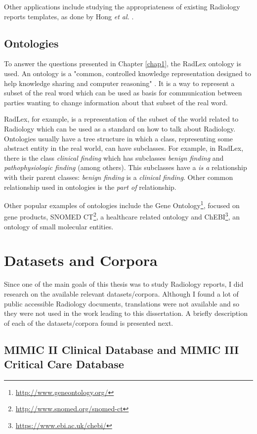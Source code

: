 Other applications include studying the appropriateness of existing Radiology reports templates, as done by Hong \textit{et al.} \citep{Hong2013}.

\subsection{Ontologies}

To answer the questions presented in Chapter \ref{chap1}, the RadLex ontology is used. An ontology is a "common, controlled knowledge representation designed to help knowledge sharing and computer reasoning" \citep{Robinson2011}. It is a way to represent a subset of the real word  which can be used as basis for communication between parties wanting to change information about that subset of the real word.

RadLex, for example, is a representation of the subset of the world related to Radiology which can be used as a standard on how to talk about Radiology. Ontologies usually have a tree structure in which a class, representing some abstract entity in the real world, can have subclasses. For example, in RadLex, there is the class \textit{clinical finding} which has subclasses \textit{benign finding} and \textit{pathophysiologic finding} (among others). This subclasses have a \textit{is a} relationship with their parent classes: \textit{benign finding} is a \textit{clinical finding}. Other common relationship used in ontologies is the \textit{part of} relationship.

Other popular examples of ontologies include the Gene Ontology\footnote{\url{http://www.geneontology.org/}}, focused on gene products, SNOMED CT\footnote{\url{http://www.snomed.org/snomed-ct}}, a healthcare related ontology and ChEBI\footnote{\url{https://www.ebi.ac.uk/chebi/}}, an ontology of small molecular entities.

\section{Datasets and Corpora}

Since one of the main goals of this thesis was to study Radiology reports, I did research on the available relevant datasets/corpora. Although I found a lot of public accessible Radiology documents, translations were not available and so they were not used in the work leading to this dissertation. A briefly description of each of the datasets/corpora found is presented next. 

\subsection{MIMIC II Clinical Database and MIMIC III Critical Care Database}

